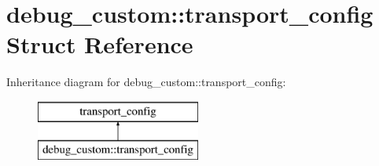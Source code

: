 \hypertarget{structdebug__custom_1_1transport__config}{}\section{debug\+\_\+custom\+:\+:transport\+\_\+config Struct Reference}
\label{structdebug__custom_1_1transport__config}
Inheritance diagram for debug\+\_\+custom\+:\+:transport\+\_\+config\+:\begin{figure}[H]
\begin{center}
\leavevmode
\includegraphics[height=2.000000cm]{structdebug__custom_1_1transport__config}
\end{center}
\end{figure}
